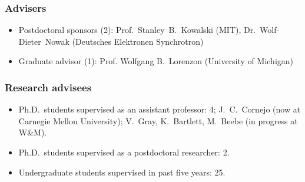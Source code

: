 \documentclass[11pt,letterpaper]{article}
\begin{document}
\subsubsection*{Advisers}
\begin{itemize}
 \setlength{\itemsep}{0pt}
 \setlength{\parskip}{0pt}
 \setlength{\parsep}{0pt}
 \item Postdoctoral sponsors (2): Prof.~Stanley~B.~Kowalski (MIT),  Dr.~Wolf-Dieter~Nowak (Deutsches Elektronen Synchrotron)
 \item Graduate advisor (1): Prof. Wolfgang B.~Lorenzon (University of Michigan)
\end{itemize}

\subsubsection*{Research advisees}
\begin{itemize}
\setlength{\itemsep}{0pt}
\setlength{\parskip}{0pt}
\setlength{\parsep}{0pt}
\item Ph.D.~students supervised as an assistant professor: 4; J.~C.~Cornejo (now at Carnegie Mellon University); V.~Gray, K.~Bartlett, M.~Beebe (in progress at W\&M).
%
\item Ph.D.~students supervised as a postdoctoral researcher: 2.
%
\item Undergraduate students supervised in past five years: 25.

\end{itemize}


\newpage
\setcounter{page}{1}


\end{document}
